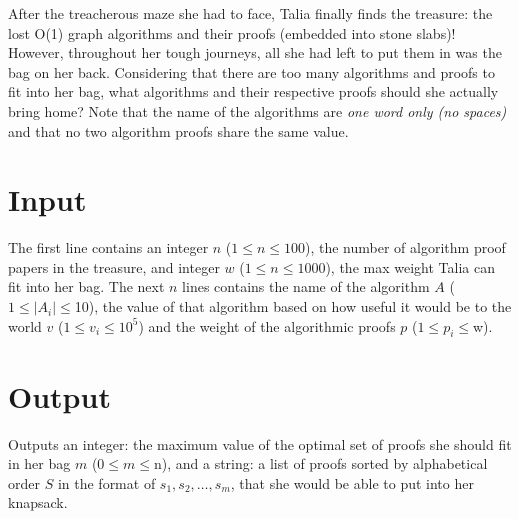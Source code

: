 
After the treacherous maze she had to face, Talia finally finds the treasure: the lost O(1) graph algorithms and their proofs (embedded into stone slabs)! 
However, throughout her tough journeys, all she had left to put them in was the bag on her back. Considering that there are too many algorithms and proofs to fit 
into her bag, what algorithms and their respective proofs should she actually bring home? Note that the name of the algorithms are {\em one word only (no spaces)} 
and that no two algorithm proofs share the same value.


\section*{Input}
The first line contains an integer $n$ ($1 \le n \le 100$), the number of algorithm proof papers in the treasure, and integer $w$ ($1 \le n \le 1000$), 
the max weight Talia can fit into her bag. The next $n$ lines contains the name of the algorithm $A$ ($1 \le |A_i| \le $10), 
the value of that algorithm based on how useful it would be to the world $v$ ($1 \le v_i \le 10^5$)
and the weight of the algorithmic proofs $p$ ($1 \le p_i \le $w).

\section*{Output}
Outputs an integer: the maximum value of the optimal set of proofs she should fit in her bag $m$ ($0 \le m \le $n), 
and a string: a list of proofs sorted by alphabetical order $S$ in the format of $s_1, s_2, \dots, s_m$, that she would be able to put into her knapsack.
